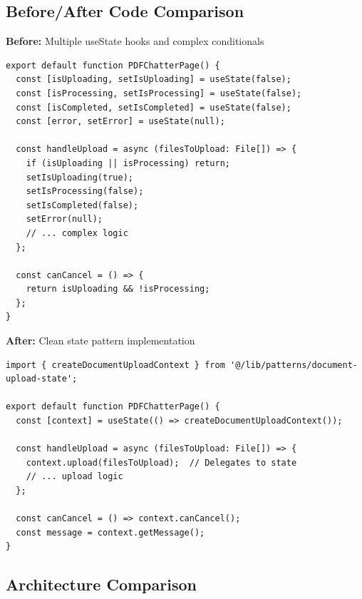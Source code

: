 \documentclass[11pt,a4paper]{article}
\begin{document}
\subsection{Before/After Code Comparison}

\textbf{Before:} Multiple useState hooks and complex conditionals

\begin{lstlisting}
export default function PDFChatterPage() {
  const [isUploading, setIsUploading] = useState(false);
  const [isProcessing, setIsProcessing] = useState(false);
  const [isCompleted, setIsCompleted] = useState(false);
  const [error, setError] = useState(null);
  
  const handleUpload = async (filesToUpload: File[]) => {
    if (isUploading || isProcessing) return;
    setIsUploading(true);
    setIsProcessing(false);
    setIsCompleted(false);
    setError(null);
    // ... complex logic
  };
  
  const canCancel = () => {
    return isUploading && !isProcessing;
  };
}
\end{lstlisting}

\textbf{After:} Clean state pattern implementation

\begin{lstlisting}
import { createDocumentUploadContext } from '@/lib/patterns/document-upload-state';

export default function PDFChatterPage() {
  const [context] = useState(() => createDocumentUploadContext());
  
  const handleUpload = async (filesToUpload: File[]) => {
    context.upload(filesToUpload);  // Delegates to state
    // ... upload logic
  };
  
  const canCancel = () => context.canCancel();
  const message = context.getMessage();
}
\end{lstlisting}

\subsection{Architecture Comparison}
\end{document}
